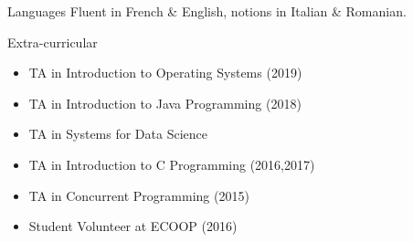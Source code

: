 


\begin{cvskills}


\cvskill
{Languages} %
{Fluent in French \& English, notions in Italian \& Romanian.} %

\cvskill
{Extra-curricular}
{
	\begin{itemize}
  \item TA in Introduction to Operating Systems (2019)
  \item TA in Introduction to Java Programming (2018)
  \item TA in Systems for Data Science
	\item TA in Introduction to C Programming (2016,2017)
	\item TA in Concurrent Programming (2015)
	\item Student Volunteer at ECOOP (2016)
	\end{itemize}
}


\end{cvskills}
